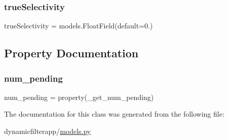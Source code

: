 \mbox{\label{classdynamicfilterapp_1_1models_1_1_predicate_ad83f72684951b87b2dc27c4e469b2bb5}} 
\subsubsection{\texorpdfstring{trueSelectivity}{trueSelectivity}}
{\footnotesize\ttfamily true\+Selectivity = models.\+Float\+Field(default=0.)\hspace{0.3cm}{\ttfamily [static]}}



\subsection{Property Documentation}
\mbox{\label{classdynamicfilterapp_1_1models_1_1_predicate_a098558b4669412bf8a4958680b5ea760}} 
\subsubsection{\texorpdfstring{num\_pending}{num\_pending}}
{\footnotesize\ttfamily num\+\_\+pending = property(\+\_\+get\+\_\+num\+\_\+pending)\hspace{0.3cm}{\ttfamily [static]}}



The documentation for this class was generated from the following file\+:\begin{DoxyCompactItemize}
\item 
dynamicfilterapp/\mbox{\hyperlink{models_8py}{models.\+py}}\end{DoxyCompactItemize}

